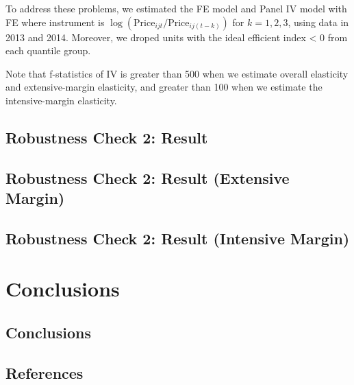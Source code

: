 \documentclass[ review  , 3p ]{elsarticle}
\begin{document}
  To address these problems, we estimated the FE model and Panel IV model with FE where instrument is \(\log(\text{Price}_{ijt}/\text{Price}_{ij(t-k)})\) for \(k = 1, 2, 3\), using data in 2013 and 2014.
  Moreover, we droped units with the ideal efficient index \textless{} 0 from each quantile group.
  
  Note that f-statistics of IV is greater than 500 when we estimate overall elasticity and extensive-margin elasticity, and greater than 100 when we estimate the intensive-margin elasticity.
  
  \hypertarget{robustness-check-2-result-1}{%
  \subsection{Robustness Check 2: Result}\label{robustness-check-2-result-1}}
  
  \hypertarget{robustness-check-2-result-extensive-margin}{%
  \subsection{Robustness Check 2: Result (Extensive Margin)}\label{robustness-check-2-result-extensive-margin}}
  
  \hypertarget{robustness-check-2-result-intensive-margin}{%
  \subsection{Robustness Check 2: Result (Intensive Margin)}\label{robustness-check-2-result-intensive-margin}}
  
  \hypertarget{conclusions}{%
  \section{Conclusions}\label{conclusions}}
  
  \hypertarget{conclusions-1}{%
  \subsection{Conclusions}\label{conclusions-1}}
  
  \clearpage
  
  \hypertarget{references}{%
  \subsection*{References}\label{references}}
\end{document}
